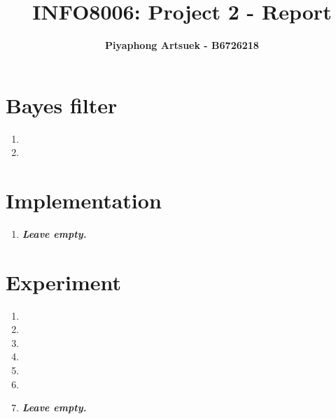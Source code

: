 \documentclass{article}
\begin{document}

\title{\Large{INFO8006: Project 2 - Report}}
\vspace{1cm}
\author{\small{\bf Piyaphong Artsuek - B6726218}}

\maketitle


\section{Bayes filter}

\begin{enumerate}[label=\alph*.,leftmargin=*]
    \item
    \item
\end{enumerate}

\section{Implementation}

\begin{enumerate}[label=\alph*.,leftmargin=*]
    \item \textbf{\textit{Leave empty.}}
\end{enumerate}

\section{Experiment}

\begin{enumerate}[label=\alph*.,leftmargin=*]
    \item
    \item
    \item
    \item
    \item
    \item
    \item \textbf{\textit{Leave empty.}}
\end{enumerate}

\end{document}
